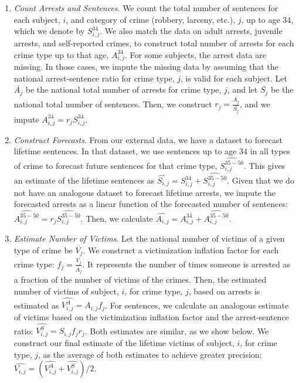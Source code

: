 \begin{enumerate}
\item \textit{Count Arrests and Sentences}. We count the total number of sentences for each subject, $i$, and category of crime (robbery, larceny, etc.), $j$, up to age 34,  which we denote by $S_{i,j}^{34}$. We also match the data on adult arrests, juvenile arrests, and self-reported crimes, to construct total number of  arrests for each crime type up to that age, $A_{i,j}^{34}$. For some subjects, the arrest data are missing. In those cases, we impute the missing data by assuming that the national arrest-sentence ratio for crime type, $j$, is valid for each subject. Let $\overline{A_j}$ be the national total number of arrests for crime type, $j$, and let $\overline{S_j}$ be the national total number of sentences. Then, we construct $r_j=\frac{\overline{A_j}}{\overline{S_j}}$, and we impute $A_{i,j}^{34}=r_j S_{i,j}^{34}$.

\item \textit{Construct Forecasts}. From our external data, we have a dataset to forecast lifetime sentences. In that dataset, we use sentences up to age 34 in all types of crime to forecast future sentences for that crime type, $\widehat{S_{i,j}^{35-50}}$. This gives an estimate of the lifetime sentences as $\widehat{S_{i,j}}=S_{i,j}^{34}+\widehat{S_{i,j}^{35-50}}$. Given that we do not have an analogous dataset to forecast lifetime arrests, we impute the forecasted arrests as a linear function of the forecasted number of sentences: $\widehat{A_{i,j}^{35-50}}=r_j \widehat{S_{i,j}^{35-50}}$. Then, we calculate $\widehat{A_{i,j}}=A_{i,j}^{34}+\widehat{A_{i,j}^{35-50}}$.

\item \textit{Estimate Number of Victims}. Let the national number of victims of a given type of crime be $\overline{V_j}$. We construct a victimization inflation factor for each crime type: $f_j=\frac{\overline{V_j}}{\overline{A_j}}$. It represents the number of times someone is arrested as a fraction of the number of victims of the crimes. Then, the estimated number of victims of subject, $i$, for crime type, $j$, based on arrests is estimated as $\widehat{V_{i,j}^{A}}=A_{i,j}f_j$. For sentences, we calculate an analogous estimate of victims based on the victimization inflation factor and the arrest-sentence ratio: $\widehat{V_{i,j}^{S}}=S_{i,j}f_j r_j$. Both estimates are similar, as we show below. We construct our final estimate of the lifetime victims of subject, $i$, for crime type, $j$, as the average of both estimates to achieve greater precision: $\widehat{V_{i,j}}=\left(\widehat{V_{i,j}^A}+\widehat{V_{i,j}^S}\right)/2$.


\end{enumerate}
